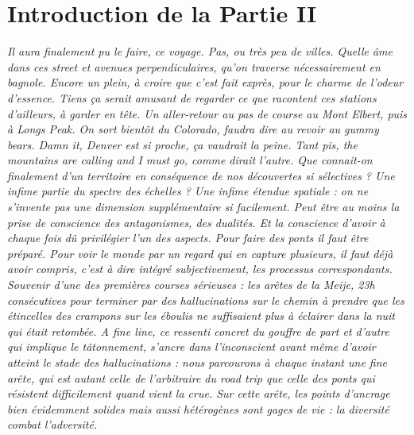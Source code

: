 


\chapter*{Introduction de la Partie II}









\bigskip




\textit{Il aura finalement pu le faire, ce voyage. Pas, ou très peu de villes. Quelle âme dans ces \emph{street} et \emph{avenues} perpendiculaires, qu'on traverse nécessairement en bagnole. Encore un plein, à croire que c'est fait exprès, pour le charme de l'odeur d'essence. Tiens ça serait amusant de regarder ce que racontent ces stations d'ailleurs, à garder en tête. Un aller-retour au pas de course au Mont Elbert, puis à Longs Peak. On sort bientôt du Colorado, faudra dire au revoir au gummy bears. Damn it, Denver est si proche, ça vaudrait la peine. Tant pis, the mountains are calling and I must go, comme dirait l'autre. Que connait-on finalement d'un territoire en conséquence de nos découvertes si sélectives ? Une infime partie du spectre des échelles ? Une infime étendue spatiale : on ne s'invente pas une dimension supplémentaire si facilement. Peut être au moins la prise de conscience des antagonismes, des dualités. Et la conscience d'avoir à chaque fois dû privilégier l'un des aspects. Pour faire des ponts il faut être préparé. Pour voir le monde par un regard qui en capture plusieurs, il faut déjà avoir \emph{compris}, c'est à dire intégré subjectivement, les processus correspondants. Souvenir d'une des premières courses sérieuses : les arêtes de la Meije, 23h consécutives pour terminer par des hallucinations sur le chemin à prendre que les étincelles des crampons sur les éboulis ne suffisaient plus à éclairer dans la nuit qui était retombée. \emph{A fine line}, ce ressenti concret du gouffre de part et d'autre qui implique le tâtonnement, s'ancre dans l'inconscient avant même d'avoir atteint le stade des hallucinations : nous parcourons à chaque instant une fine arête, qui est autant celle de l'arbitraire du road trip que celle des ponts qui résistent difficilement quand vient la crue. Sur cette arête, les points d'ancrage bien évidemment solides mais aussi hétérogènes sont gages de vie : la diversité combat l'adversité.}

